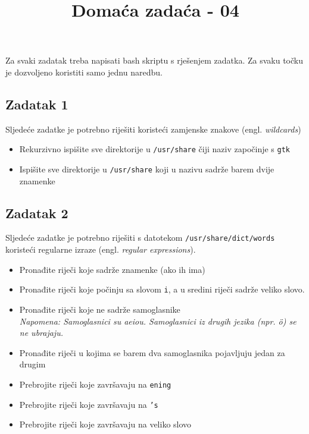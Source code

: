 \documentclass[12pt,a4paper]{article}
\newcommand{\shell}[1]{\texttt{#1}}
\begin{document}
	\title{Domaća zadaća - 04\vspace{-2em}}
	\maketitle
	Za svaki zadatak treba napisati bash skriptu s rješenjem zadatka. Za svaku točku je dozvoljeno koristiti samo jednu naredbu.

	\subsection*{Zadatak 1}
	Sljedeće zadatke je potrebno riješiti koristeći zamjenske znakove (engl. \emph{wildcards})
	\begin{itemize}
		\item Rekurzivno ispišite sve direktorije u \shell{/usr/share} čiji naziv započinje s \shell{gtk}
		\item Ispišite sve direktorije u \shell{/usr/share} koji u nazivu sadrže barem dvije znamenke
	\end{itemize}

	\subsection*{Zadatak 2}
	Sljedeće zadatke je potrebno riješiti s datotekom \shell{/usr/share/dict/words} koristeći regularne izraze (engl. \emph{regular expressions}).
	\begin{itemize}
		\item Pronađite riječi koje sadrže znamenke (ako ih ima)
		\item Pronađite riječi koje počinju sa slovom \shell{i}, a u sredini riječi sadrže veliko slovo.
		\item Pronađite riječi koje ne sadrže samoglasnike \\ \emph{Napomena: Samoglasnici su aeiou. Samoglasnici iz drugih jezika (npr. ö) se ne ubrajaju.}
		\item Pronađite riječi u kojima se barem dva samoglasnika pojavljuju jedan za drugim
		\item Prebrojite riječi koje završavaju na \shell{ening}
		\item Prebrojite riječi koje završavaju na \shell{'s}
		\item Prebrojite riječi koje završavaju na veliko slovo
	\end{itemize}
\end{document}
